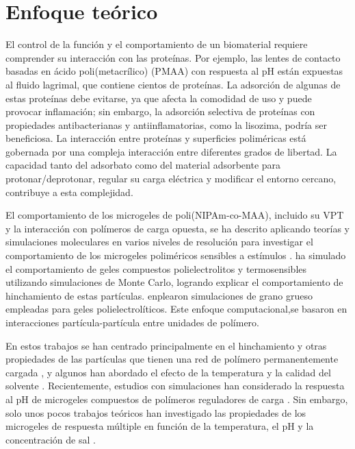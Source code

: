\section{Enfoque te\'orico}


El control de la funci\'on y el comportamiento de un biomaterial requiere comprender su interacci\'on con las prote\'inas.%
 Por ejemplo, las lentes de contacto basadas en \'acido poli(metacr\'ilico) (PMAA) con respuesta al pH est\'an expuestas al fluido lagrimal, que contiene cientos de prote\'inas. La adsorci\'on de algunas de estas prote\'inas debe evitarse, ya que afecta la comodidad de uso y puede provocar inflamaci\'on; sin embargo, la adsorci\'on selectiva de prote\'inas con propiedades antibacterianas y antiinflamatorias, como la lisozima, podr\'ia ser beneficiosa. 
La interacci\'on entre prote\'inas y superficies polim\'ericas est\'a gobernada por una compleja interacci\'on entre diferentes grados de libertad. La capacidad tanto del adsorbato como del material adsorbente para protonar/deprotonar, regular su carga el\'ectrica y modificar el entorno cercano, contribuye a esta complejidad.


El comportamiento de los microgeles de poli(NIPAm-co-MAA), incluido su VPT y la interacci\'on con pol\'imeros de carga opuesta, se ha descrito aplicando teor\'ias  y simulaciones moleculares en varios niveles de resoluci\'on para investigar el comportamiento de los microgeles polim\'ericos sensibles a est\'imulos \cite{ahualli2016coarse,Landsgesell2019SM}.
\citet{quesada2011gel} ha simulado el comportamiento de geles compuestos  polielectrolitos y termosensibles utilizando  simulaciones de Monte Carlo, logrando explicar el comportamiento de hinchamiento de estas part\'iculas.
\citet{ahualli2016coarse}
enplearon simulaciones de grano grueso empleadas para geles polielectrol\'iticos. Este enfoque computacional,se basaron en interacciones part\'icula-partícula entre unidades de pol\'imero. 

En estos trabajos se han centrado principalmente en el hinchamiento y otras propiedades de las part\'iculas que tienen una red de pol\'imero permanentemente cargada , y algunos han abordado el efecto de la temperatura y la calidad del solvente \cite{Jha2011, QuesadaPerez2013, moncho-jorda2016a, ahualli2016coarse, AdroherBenitez2017PCCP}.
Recientemente, estudios  con simulaciones han considerado la respuesta al pH de microgeles compuestos de pol\'imeros reguladores de carga \cite{Schroeder2015,Rud2017,Sean2018, Hofzumahaus2018,Lu2019}.
Sin embargo, solo unos pocos trabajos te\'oricos han investigado las propiedades de los microgeles de respuesta m\'ultiple en funci\'on de la temperatura, el pH y la concentración de sal  \cite{CaprilesGonzalez2008,polotsky2013collapse}.

